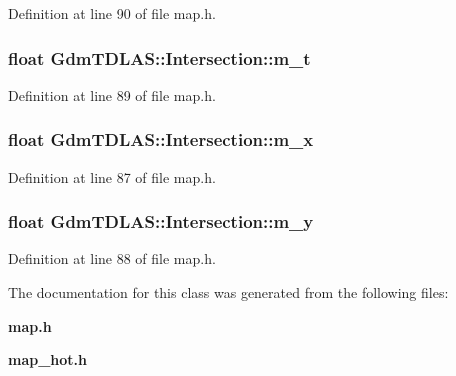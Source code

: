 Definition at line 90 of file map.h.

\subsubsection[{m\_\-t}]{\setlength{\rightskip}{0pt plus 5cm}float {\bf GdmTDLAS::Intersection::m\_\-t}}\label{classGdmTDLAS_1_1Intersection_a4306d88cd7dd46347d90cddf6ab8bd84}


Definition at line 89 of file map.h.

\subsubsection[{m\_\-x}]{\setlength{\rightskip}{0pt plus 5cm}float {\bf GdmTDLAS::Intersection::m\_\-x}}\label{classGdmTDLAS_1_1Intersection_ac72a4ea252b6b6a8dfd972e12fa66ba1}


Definition at line 87 of file map.h.

\subsubsection[{m\_\-y}]{\setlength{\rightskip}{0pt plus 5cm}float {\bf GdmTDLAS::Intersection::m\_\-y}}\label{classGdmTDLAS_1_1Intersection_a5120723103916028c481cd26887c949c}


Definition at line 88 of file map.h.



The documentation for this class was generated from the following files:\begin{DoxyCompactItemize}
\item 
{\bf map.h}\item 
{\bf map\_\-hot.h}\end{DoxyCompactItemize}
